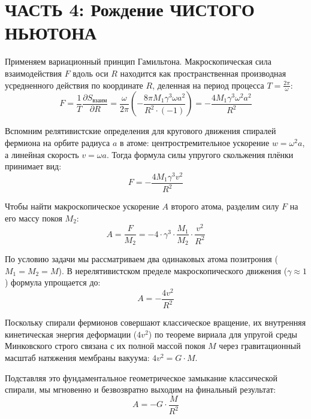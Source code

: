 \documentclass[12pt,a4paper]{article}
\begin{document}
\section*{ЧАСТЬ 4: Рождение ЧИСТОГО НЬЮТОНА}

Применяем вариационный принцип Гамильтона. Макроскопическая сила взаимодействия $F$ вдоль оси $R$ находится как пространственная производная усредненного действия по координате $R$, деленная на период процесса $T = \frac{2\pi}{\omega}$:
\begin{equation}
F = \frac{1}{T} \frac{\partial S_{взаим}}{\partial R} = \frac{\omega}{2\pi} \left( - \frac{8\pi M_1 \gamma^3 \omega a^2}{R^2 \cdot (-1)} \right) = - \frac{4 M_1 \gamma^3 \omega^2 a^2}{R^2}
\end{equation}

Вспомним релятивистские определения для кругового движения спиралей фермиона на орбите радиуса $a$ в атоме: центростремительное ускорение $w = \omega^2 a$, а линейная скорость $v = \omega a$. Тогда формула силы упругого скольжения плёнки принимает вид:
\begin{equation}
F = - \frac{4 M_1 \gamma^3 v^2}{R^2}
\end{equation}

Чтобы найти макроскопическое ускорение $A$ второго атома, разделим силу $F$ на его массу покоя $M_2$:
\begin{equation}
A = \frac{F}{M_2} = - 4 \cdot \gamma^3 \cdot \frac{M_1}{M_2} \cdot \frac{v^2}{R^2}
\end{equation}

По условию задачи мы рассматриваем два одинаковых атома позитрония ($M_1 = M_2 = M$). В нерелятивистском пределе макроскопического движения ($\gamma \approx 1$) формула упрощается до:
\begin{equation}
A = - \frac{4 v^2}{R^2}
\end{equation}

Поскольку спирали фермионов совершают классическое вращение, их внутренняя кинетическая энергия деформации ($4v^2$) по теореме вириала для упругой среды Минковского строго связана с их полной массой покоя $M$ через гравитационный масштаб натяжения мембраны вакуума: $4 v^2 = G \cdot M$.

Подставляя это фундаментальное геометрическое замыкание классической спирали, мы мгновенно и безвозвратно выходим на финальный результат:
\begin{equation}
A = - G \cdot \frac{M}{R^2}
\end{equation}
\end{document}
